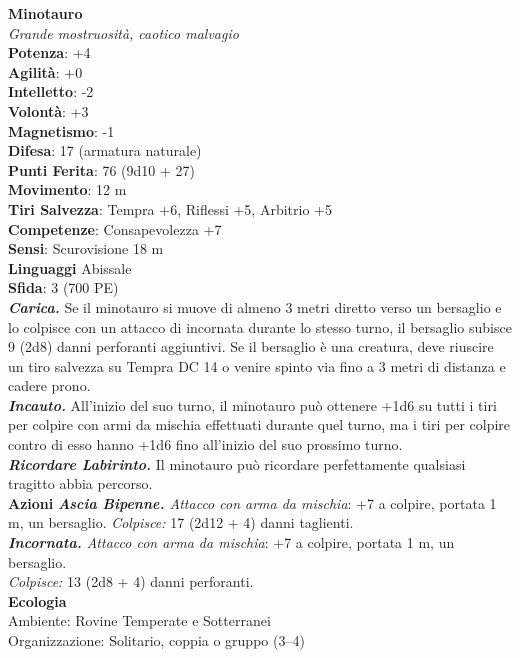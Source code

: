 \begin{multicols}{2}
\medskip\textbf{Minotauro}\\
\emph{Grande mostruosità, caotico malvagio}\\
\textbf{Potenza}: +4\\
\textbf{Agilità}: +0\\
\textbf{Intelletto}: -2\\
\textbf{Volontà}: +3\\
\textbf{Magnetismo}: -1\\
\textbf{Difesa}: 17 (armatura naturale)\\
\textbf{Punti Ferita}: 76 (9d10 + 27)\\
\textbf{Movimento}: 12 m\\
\textbf{Tiri Salvezza}: Tempra +6, Riflessi +5, Arbitrio +5\\
\textbf{Competenze}: Consapevolezza +7\\
\textbf{Sensi}: Scurovisione 18 m\\
\textbf{Linguaggi} Abissale\\
\textbf{Sfida}: 3 (700 PE)\smallskip\\
\emph{\textbf{Carica.}} Se il minotauro si muove di almeno 3 metri diretto verso un bersaglio e lo colpisce con un attacco di incornata durante lo stesso turno, il bersaglio subisce 9 (2d8) danni perforanti aggiuntivi. Se il bersaglio è una creatura, deve riuscire un tiro salvezza su Tempra DC 14 o venire spinto via fino a 3 metri di distanza e cadere prono.\\
\emph{\textbf{Incauto.}} All'inizio del suo turno, il minotauro può ottenere +1d6 su tutti i tiri per colpire con armi da mischia effettuati durante quel turno, ma i tiri per colpire contro di esso hanno +1d6 fino all'inizio del suo prossimo turno.\\
\emph{\textbf{Ricordare Labirinto.}} Il minotauro può ricordare perfettamente qualsiasi tragitto abbia percorso.\\
\smallskip\textbf{Azioni}  
\emph{\textbf{Ascia Bipenne.} Attacco con arma da mischia}: +7 a colpire, portata 1 m, un bersaglio.
\emph{Colpisce:} 17 (2d12 + 4) danni taglienti.\\
\emph{\textbf{Incornata.} Attacco con arma da mischia}: +7 a colpire, portata 1 m, un bersaglio.\\
\emph{Colpisce:} 13 (2d8 + 4) danni perforanti.\\
\textbf{Ecologia}\\
Ambiente: Rovine Temperate e Sotterranei\\
Organizzazione: Solitario, coppia o gruppo (3–4)\\

\end{multicols}
